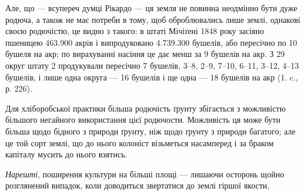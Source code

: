 Але, що — всупереч думці Рікардо — ця земля не повинна неодмінно бути
дуже родюча, а також не має потреби в тому, щоб оброблювались лише землі,
однакові своєю родючістю, це видно з такого: в штаті Мічіґені 1848 року засіяно
пшеницею \num{463.900} акрів і випродуковано \num{4.739.300} бушелів, або пересічно по
10 бушеля на акр; по вирахуванні насіння це дає менш за 9 бушелів на
акр. З 29 округ штату 2 продукували пересічно 7 бушелів, 3--8, 2--9, 7--10, 6--11, 3--12, 4--13 бушелів, і
лише одна округа — 16 бушелів і ще одна — 18 бушелів на акр (1. c., р. 226).

Для хліборобської практики більша родючість ґрунту збігається з можливістю
більшого негайного використання цієї родючости. Можливість ця може бути
більша щодо бідного з природи ґрунту, ніж щодо ґрунту з природи багатого;
але це той сорт землі, що до нього колоніст візьметься насамперед і за браком
капіталу мусить до нього взятись.

\emph{Нарешті}, поширення культури на більші площі — лишаючи осторонь щойно розглянений випадок, коли
доводиться звертатися до землі гіршої якости,
\parbreak{}  %
